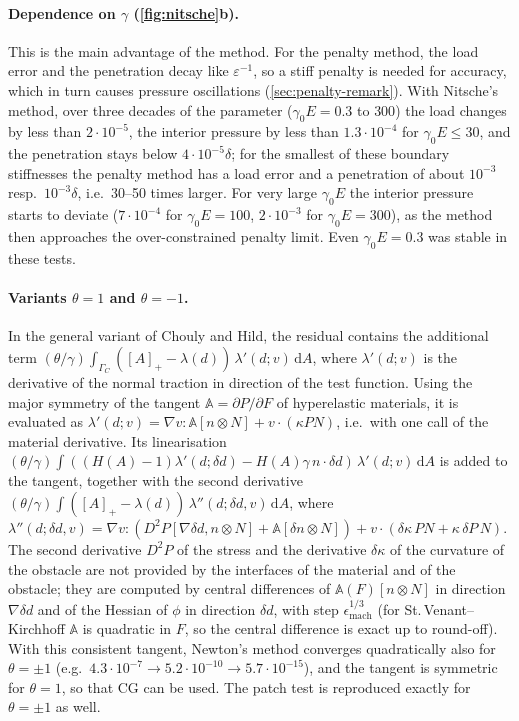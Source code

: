 \documentclass[11pt,a4paper]{article}
\newcommand{\dd}{\,\mathrm{d}}
\begin{document}
\paragraph{Dependence on $\gamma$ (\cref{fig:nitsche}b).}
This is the main advantage of the method. For the penalty method, the load error and the penetration
decay like $\varepsilon^{-1}$, so a stiff penalty is needed for accuracy, which in turn causes
pressure oscillations (\cref{sec:penalty-remark}). With Nitsche's method, over three decades of the
parameter ($\gamma_0E = 0.3$ to $300$) the load changes by less than $2\cdot10^{-5}$, the interior
pressure by less than $1.3\cdot10^{-4}$ for $\gamma_0E\le30$, and the penetration stays below
$4\cdot10^{-5}\delta$; for the smallest of these boundary stiffnesses the penalty method has a load
error and a penetration of about $10^{-3}$ resp.\ $10^{-3}\delta$, i.e.\ 30--50 times larger. For very large $\gamma_0E$ the interior
pressure starts to deviate ($7\cdot10^{-4}$ for $\gamma_0E=100$, $2\cdot10^{-3}$ for
$\gamma_0E=300$), as the method then approaches the over-constrained penalty limit. Even
$\gamma_0E=0.3$ was stable in these tests.

\paragraph{Variants $\theta=1$ and $\theta=-1$.}
In the general variant of Chouly and Hild, the residual contains the additional term
$(\theta/\gamma)\int_{\Gamma_C}([A]_+ - \lambda(d))\,\lambda'(d; v)\dd A$, where $\lambda'(d;v)$ is
the derivative of the normal traction in direction of the test function. Using the major symmetry
of the tangent $\mathbb{A}=\partial P/\partial F$ of hyperelastic materials, it is evaluated as
$\lambda'(d;v) = \nabla v : \mathbb{A}[n\otimes N] + v\cdot(\kappa P N)$, i.e.\ with one call of
the material derivative. Its linearisation
$(\theta/\gamma)\int((H(A)-1)\lambda'(d;\delta d) - H(A)\gamma\, n\cdot\delta d)\,\lambda'(d;v)\dd A$ is
added to the tangent, together with the second derivative
$(\theta/\gamma)\int([A]_+-\lambda(d))\,\lambda''(d;\delta d, v)\dd A$, where
$\lambda''(d;\delta d,v) = \nabla v : (D^2P[\nabla\delta d, n\otimes N] + \mathbb{A}[\delta n\otimes N])
+ v\cdot(\delta\kappa\, P N + \kappa\,\delta P\, N)$. The second derivative $D^2P$ of the stress and
the derivative $\delta\kappa$ of the curvature of the obstacle are not provided by the interfaces of
the material and of the obstacle; they are computed by central differences of $\mathbb{A}(F)[n\otimes N]$
in direction $\nabla\delta d$ and of the Hessian of $\phi$ in direction $\delta d$, with step
$\epsilon_{\mathrm{mach}}^{1/3}$ (for St.\,Venant--Kirchhoff $\mathbb{A}$ is quadratic in $F$, so the
central difference is exact up to round-off). With this consistent tangent, Newton's method
converges quadratically also for $\theta=\pm1$ (e.g.\
$4.3\cdot10^{-7}\to5.2\cdot10^{-10}\to5.7\cdot10^{-15}$), and the tangent is symmetric for
$\theta=1$, so that CG can be used. The patch test is reproduced exactly for $\theta=\pm1$ as well.
\end{document}
